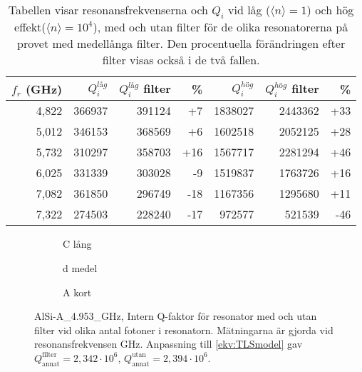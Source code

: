 \documentclass[main.tex]{subfiles}
\begin{document}
\begin{table}[h]
\centering
\caption{Tabellen visar resonansfrekvenserna och $Q_i$ vid låg ($\langle n\rangle=1$) och hög effekt($\langle n\rangle=10^4$), med och utan filter för de olika resonatorerna på provet med medellånga filter. Den procentuella förändringen efter filter visas också i de två fallen.}
\label{tab:Qi_d}
\begin{tabular}{rrrrrrr}
\toprule
$f_r$ (\unit{GHz}) & $Q_i^{låg}$ & $Q_i^{låg}$ filter & \% & $Q_i^{hög}$ & $Q_i^{hög}$ filter & \% \\
\midrule
4,822 & 366937 & 391124 & +7 & 1838027 & 2443362 & +33 \\
5,012 & 346153 & 368569 & +6 & 1602518 & 2052125 & +28 \\
5,732 & 310297 & 358703 & +16 & 1567717 & 2281294 & +46 \\
6,025 & 331339 & 303028 & -9 & 1519837 & 1763726 & +16 \\
7,082 & 361850 & 296749 & -18 & 1167356 & 1295680 & +11 \\
7,322 & 274503 & 228240 & -17 & 972577 & 521539 & -46 \\
\bottomrule
\end{tabular}
\end{table}


\begin{figure}
    \begin{subfigure}{0.5\textwidth}
    \centering
    \setlength{}
    \setlength\figureheight{11em}
    
    \caption{C lång}
    \end{subfigure}
    \begin{subfigure}{0.5\textwidth}
    \centering
    \setlength{}
    \setlength\figureheight{11em}
    
    \caption{d medel}
    \end{subfigure}
    \begin{center}
    \begin{subfigure}{0.75\textwidth}
    \centering
    \setlength{}
    \setlength\figureheight{11em}
    
    \caption{A kort}
    \end{subfigure}
    \end{center}
    \caption{}
    \label{fig:my_label}
\end{figure}


\iffalse
\begin{figure}[H]
  \centering
  \setlength{}
  \setlength\figureheight{15em}
  
  \caption{AlSi-A\_4.953\_GHz, Intern Q-faktor för resonator med och utan filter vid olika antal fotoner i resonatorn. Mätningarna är gjorda vid resonansfrekvensen \unit[4,953]{GHz}. Anpassning till \ref{ekv:TLSmodel} gav $Q_{\text{annat}}^{\text{filter}}=2,342\cdot10^6$, $Q_{\text{annat}}^{\text{utan}}=2,394\cdot10^6$.} 
  \label{fig:A4.953}
\end{figure}
\end{document}

